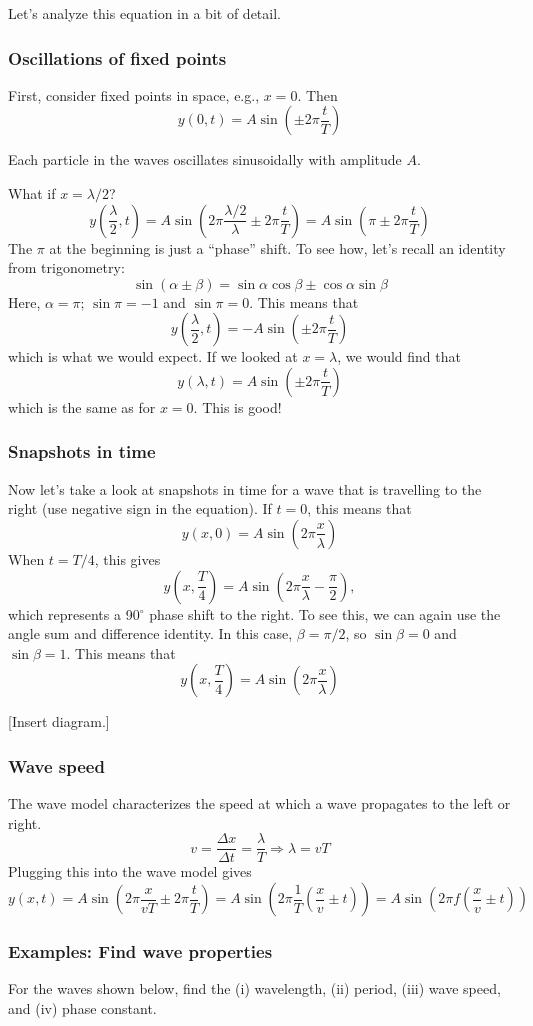Let's analyze this equation in a bit of detail. 

\subsubsection{Oscillations of fixed points}
First, consider fixed points in space, e.g., $x=0$. Then
$$y(0,t)=A\sin\left(\pm 2\pi\frac{t}{T}\right)$$

Each particle in the waves oscillates sinusoidally with amplitude $A$.

What if $x=\lambda/2$?
$$y\left(\frac{\lambda}{2},t\right)=A\sin\left(2\pi\frac{\lambda/2}{\lambda}\pm 2\pi\frac{t}{T}\right)=A\sin\left(\pi\pm 2\pi\frac{t}{T}\right)$$
The $\pi$ at the beginning is just a ``phase'' shift. To see how, let's recall an identity from trigonometry:
$$\sin(\alpha\pm\beta)=\sin\alpha\cos\beta\pm\cos\alpha\sin\beta$$
Here, $\alpha=\pi$; $\sin\pi=-1$ and $\sin\pi=0$. This means that
$$y\left(\frac{\lambda}{2},t\right)=-A\sin\left(\pm 2\pi\frac{t}{T}\right)$$
which is what we would expect. If we looked at $x=\lambda$, we would find that 
$$y(\lambda,t)=A\sin\left(\pm 2\pi\frac{t}{T}\right)$$
which is the same as for $x=0$. This is good!

\subsubsection{Snapshots in time}
Now let's take a look at snapshots in time for a wave that is travelling to the right (use negative sign in the equation). If $t=0$, this means that
$$y(x,0)=A\sin\left(2\pi\frac{x}{\lambda}\right)$$
When $t=T/4$, this gives
$$y\left(x,\frac{T}{4}\right)=A\sin\left(2\pi\frac{x}{\lambda}-\frac{\pi}{2}\right),$$
which represents a 90$^\circ$ phase shift to the right. To see this, we can again use the angle sum and difference identity. In this case, $\beta=\pi/2$, so $\sin\beta=0$ and $\sin\beta=1$. This means that
$$y\left(x,\frac{T}{4}\right)=A\sin\left(2\pi\frac{x}{\lambda}\right)$$

[Insert diagram.]
\vspace{5cm}

\subsubsection{Wave speed}
The wave model characterizes the speed at which a wave propagates to the left or right.
$$v=\frac{\Delta{x}}{\Delta{t}}=\frac{\lambda}{T}\Rightarrow \lambda=vT$$
Plugging this into the wave model gives
$$y(x,t)=A\sin\left(2\pi\frac{x}{vT}\pm 2\pi\frac{t}{T}\right)=A\sin\left(2\pi\frac{1}{T}\left(\frac{x}{v}\pm t\right)\right)=A\sin\left(2\pi f\left(\frac{x}{v}\pm t\right)\right)$$

\clearpage
\subsubsection{Examples: Find wave properties}
For the waves shown below, find the (i) wavelength, (ii) period, (iii) wave speed, and (iv) phase constant.

\clearpage

